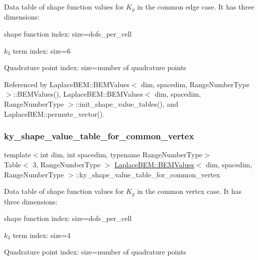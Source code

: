 Data table of shape function values for $K_y$ in the common edge case. It has three dimensions\+:
\begin{DoxyEnumerate}
\item shape function index\+: size={\ttfamily dofs\+\_\+per\+\_\+cell} 
\item $k_3$ term index\+: size=6
\item Quadrature point index\+: size=number of quadrature points 
\end{DoxyEnumerate}

Referenced by Laplace\+B\+E\+M\+::\+B\+E\+M\+Values$<$ dim, spacedim, Range\+Number\+Type $>$\+::\+B\+E\+M\+Values(), Laplace\+B\+E\+M\+::\+B\+E\+M\+Values$<$ dim, spacedim, Range\+Number\+Type $>$\+::init\+\_\+shape\+\_\+value\+\_\+tables(), and Laplace\+B\+E\+M\+::permute\+\_\+vector().

\mbox{\label{classLaplaceBEM_1_1BEMValues_a83243ee09e5105eaa81b5d622e3be3ce}} 
\subsubsection{\texorpdfstring{ky\+\_\+shape\+\_\+value\+\_\+table\+\_\+for\+\_\+common\+\_\+vertex}{ky\_shape\_value\_table\_for\_common\_vertex}}
{\footnotesize\ttfamily template$<$int dim, int spacedim, typename Range\+Number\+Type$>$ \\
Table$<$ 3, Range\+Number\+Type $>$ \hyperlink{classLaplaceBEM_1_1BEMValues}{Laplace\+B\+E\+M\+::\+B\+E\+M\+Values}$<$ dim, spacedim, Range\+Number\+Type $>$\+::ky\+\_\+shape\+\_\+value\+\_\+table\+\_\+for\+\_\+common\+\_\+vertex}

Data table of shape function values for $K_y$ in the common vertex case. It has three dimensions\+:
\begin{DoxyEnumerate}
\item shape function index\+: size={\ttfamily dofs\+\_\+per\+\_\+cell} 
\item $k_3$ term index\+: size=4
\item Quadrature point index\+: size=number of quadrature points 
\end{DoxyEnumerate}

